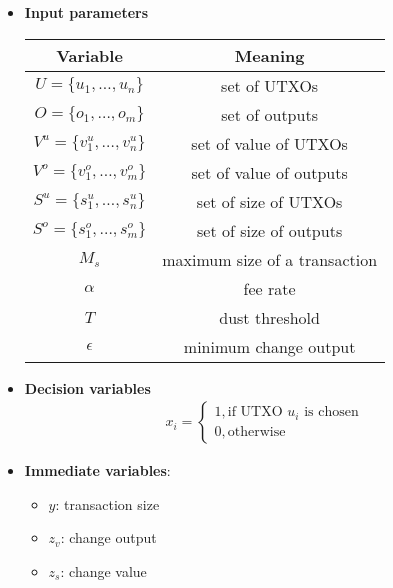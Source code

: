 \begin{itemize}
  \item \textbf{Input parameters}
    \begin{center}
    \begin{tabular}{|c|c|}
    \hline
    \textbf{Variable}                 & \textbf{Meaning}              \\ \hline
    $U = \{u_1, \ldots, u_n\}$        & set of UTXOs                  \\ \hline
    $O = \{o_1, \ldots, o_m\}$        & set of outputs                \\ \hline
    $V^u = \{v_1^u, \ldots, v_n^u \}$ & set of value of UTXOs         \\ \hline
    $V^o = \{v_1^o, \ldots, v_m^o \}$ & set of value of outputs       \\ \hline
    $S^u = \{s_1^u, \ldots, s_n^u \}$ & set of size of UTXOs          \\ \hline
    $S^o = \{s_1^o, \ldots, s_m^o \}$ & set of size of outputs        \\ \hline
    $M_s$                             & maximum size of a transaction \\ \hline
    $\alpha$                          & fee rate                      \\ \hline
    $T$                               & dust threshold                \\ \hline
    $\epsilon$                        & minimum change output         \\ \hline
    \end{tabular}
    \end{center}

  \item \textbf{Decision variables}
  \begin{align*}
    x_i =
    \begin{cases}
    1, \text{if UTXO $u_i$ is chosen} \\
    0, \text{otherwise}
    \end{cases}
  \end{align*}

  \item \textbf{Immediate variables}:
  \begin{itemize}
    \item $y$: transaction size
    \item $z_v$: change output
    \item $z_s$: change value
  \end{itemize}


\end{itemize}
